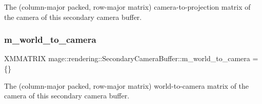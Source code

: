 The (column-\/major packed, row-\/major matrix) camera-\/to-\/projection matrix of the camera of this secondary camera buffer. \mbox{\label{structmage_1_1rendering_1_1_secondary_camera_buffer_a3f131146f9374058ace582bfae3e90b7}} 
\subsubsection{\texorpdfstring{m\+\_\+world\+\_\+to\+\_\+camera}{m\_world\_to\_camera}}
{\footnotesize\ttfamily X\+M\+M\+A\+T\+R\+IX mage\+::rendering\+::\+Secondary\+Camera\+Buffer\+::m\+\_\+world\+\_\+to\+\_\+camera = \{\}}

The (column-\/major packed, row-\/major matrix) world-\/to-\/camera matrix of the camera of this secondary camera buffer. 